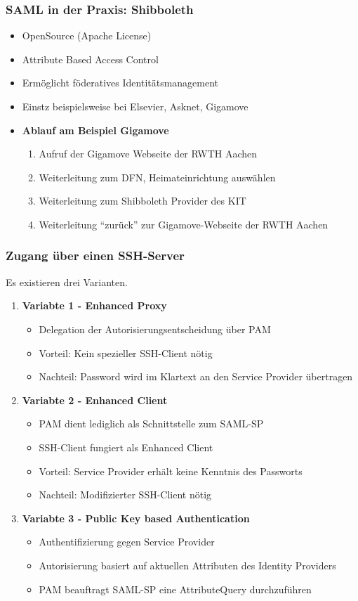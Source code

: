 \subsubsection{SAML in der Praxis: Shibboleth}
\begin{itemize}
	\item OpenSource (Apache License)
	\item Attribute Based Access Control
	\item Ermöglicht föderatives Identitätsmanagement
	\item Einstz beispielsweise bei Elsevier, Asknet, Gigamove
	\item \textbf{Ablauf am Beispiel Gigamove}
	\begin{enumerate}
		\item Aufruf der Gigamove Webseite der RWTH Aachen
		\item Weiterleitung zum DFN, Heimateinrichtung auswählen
		\item Weiterleitung zum Shibboleth Provider des KIT
		\item Weiterleitung "`zurück"' zur Gigamove-Webseite der RWTH Aachen
	\end{enumerate}
\end{itemize}

\subsubsection{Zugang über einen SSH-Server}
Es existieren drei Varianten.
\begin{enumerate}
	\item \textbf{Variabte 1 - Enhanced Proxy}
	\begin{itemize}
		\item Delegation der Autorisierungsentscheidung über PAM
		\item Vorteil: Kein spezieller SSH-Client nötig
		\item Nachteil: Password wird im Klartext an den Service Provider übertragen
	\end{itemize}
	\item \textbf{Variabte 2 - Enhanced Client}
	\begin{itemize}
		\item PAM dient lediglich als Schnittstelle zum SAML-SP
		\item SSH-Client fungiert als Enhanced Client
		\item Vorteil: Service Provider erhält keine Kenntnis des Passworts
		\item Nachteil: Modifizierter SSH-Client nötig
	\end{itemize}
	\item \textbf{Variabte 3 - Public Key based Authentication}
	\begin{itemize}
		\item Authentifizierung gegen Service Provider
		\item Autorisierung basiert auf aktuellen Attributen des Identity Providers
		\item PAM beauftragt SAML-SP eine AttributeQuery durchzuführen
	\end{itemize}
\end{enumerate}

